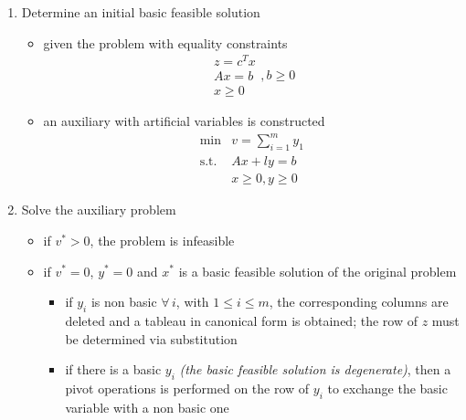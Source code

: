 \documentclass[english]{article}
\begin{document}
\begin{enumerate}[label=\textbf{Phase \arabic*:}, ref=\textbf{Phase \arabic*}]
  \item Determine an initial basic feasible solution
        \begin{itemize}
          \item given the problem with equality constraints
                \[\begin{matrix}
                    z = c^T x \\
                    Ax = b    \\
                    x \geq 0
                  \end{matrix}, b \geq 0\]
          \item an auxiliary \LP with artificial variables is constructed
                \[\begin{matrix}
                    \min        & v = \displaystyle \sum_{i=1}^m y_1 \\
                    \text{s.t.} & Ax + ly = b                        \\
                                & x \geq 0, y \geq 0
                  \end{matrix}\]
        \end{itemize}
  \item Solve the auxiliary problem
        \begin{itemize}
          \item if \(v^\ast > 0\), the problem is infeasible
          \item if \(v^\ast = 0\), \(y^\ast = 0\) and \(x^\ast\) is a basic feasible solution of the original problem
                \begin{itemize}
                  \item if \(y_i\) is non basic \(\forall \, i\), with \(1 \leq i \leq m\), the corresponding columns are deleted and a tableau in canonical form is obtained; the row of \(z\) must be determined via substitution
                  \item if there is a basic \(y_i\) \textit{(the basic feasible solution is degenerate)}, then a pivot operations is performed on the row of \(y_i\) to exchange the basic variable with a non basic one
                \end{itemize}
        \end{itemize}
\end{enumerate}
\end{document}
